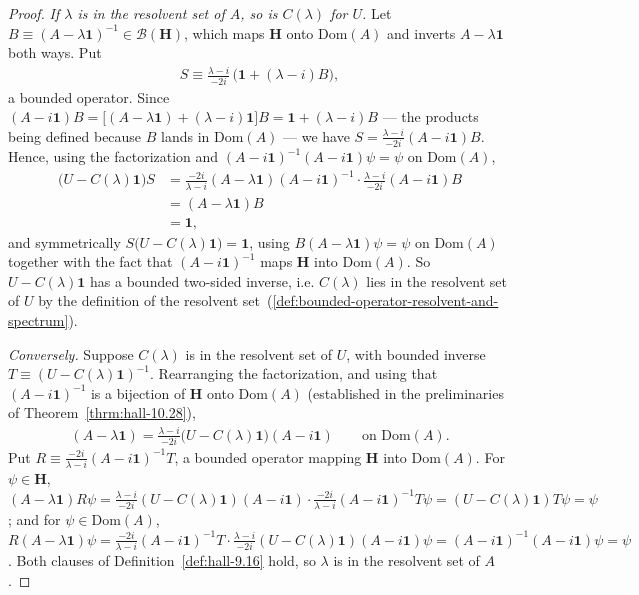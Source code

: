 \begin{proof}
\textit{If $\lambda$ is in the resolvent set of $A$, so is $C(\lambda)$ for $U$.} Let $B \equiv (A-\lambda\mathbf{1})^{-1} \in \mathcal{B}(\mathbf{H})$, which maps $\mathbf{H}$ onto $\text{Dom}(A)$ and inverts $A - \lambda\mathbf{1}$ both ways. Put
\begin{align}
    S \equiv \frac{\lambda-i}{-2i}\,\big( \mathbf{1} + (\lambda-i)B \big),
\end{align}
a bounded operator. Since $(A - i\mathbf{1})B = \big[ (A-\lambda\mathbf{1}) + (\lambda-i)\mathbf{1} \big]B = \mathbf{1} + (\lambda-i)B$ — the products being defined because $B$ lands in $\text{Dom}(A)$ — we have $S = \frac{\lambda-i}{-2i}(A-i\mathbf{1})B$. Hence, using the factorization and $(A-i\mathbf{1})^{-1}(A-i\mathbf{1})\psi = \psi$ on $\text{Dom}(A)$,
\begin{align}
    \big( U - C(\lambda)\mathbf{1} \big) S &= \frac{-2i}{\lambda-i}(A-\lambda\mathbf{1})(A-i\mathbf{1})^{-1}\cdot\frac{\lambda-i}{-2i}(A-i\mathbf{1})B \\
                &= (A-\lambda\mathbf{1})B \\
                &= \mathbf{1},
\end{align}
and symmetrically $S\big( U - C(\lambda)\mathbf{1} \big) = \mathbf{1}$, using $B(A-\lambda\mathbf{1})\psi = \psi$ on $\text{Dom}(A)$ together with the fact that $(A-i\mathbf{1})^{-1}$ maps $\mathbf{H}$ into $\text{Dom}(A)$. So $U - C(\lambda)\mathbf{1}$ has a bounded two-sided inverse, i.e. $C(\lambda)$ lies in the resolvent set of $U$ by the definition of the resolvent set~(\ref{def:bounded-operator-resolvent-and-spectrum}).

\textit{Conversely.} Suppose $C(\lambda)$ is in the resolvent set of $U$, with bounded inverse $T \equiv (U - C(\lambda)\mathbf{1})^{-1}$. Rearranging the factorization, and using that $(A-i\mathbf{1})^{-1}$ is a bijection of $\mathbf{H}$ onto $\text{Dom}(A)$ (established in the preliminaries of Theorem~\ref{thrm:hall-10.28}),
\begin{align}
    (A - \lambda\mathbf{1}) = \frac{\lambda-i}{-2i}\big( U - C(\lambda)\mathbf{1} \big)(A - i\mathbf{1}) \qquad \text{on } \text{Dom}(A).
\end{align}
Put $R \equiv \frac{-2i}{\lambda-i}(A-i\mathbf{1})^{-1}T$, a bounded operator mapping $\mathbf{H}$ into $\text{Dom}(A)$. For $\psi \in \mathbf{H}$, $(A-\lambda\mathbf{1})R\psi = \frac{\lambda-i}{-2i}(U - C(\lambda)\mathbf{1})(A-i\mathbf{1})\cdot\frac{-2i}{\lambda-i}(A-i\mathbf{1})^{-1}T\psi = (U-C(\lambda)\mathbf{1})T\psi = \psi$; and for $\psi \in \text{Dom}(A)$, $R(A-\lambda\mathbf{1})\psi = \frac{-2i}{\lambda-i}(A-i\mathbf{1})^{-1}T\cdot\frac{\lambda-i}{-2i}(U-C(\lambda)\mathbf{1})(A-i\mathbf{1})\psi = (A-i\mathbf{1})^{-1}(A-i\mathbf{1})\psi = \psi$. Both clauses of Definition~\ref{def:hall-9.16} hold, so $\lambda$ is in the resolvent set of $A$.


\end{proof}
